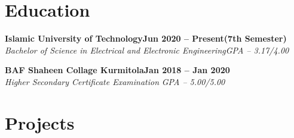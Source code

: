 \documentclass[letterpaper,10pt]{article}
\newcommand{\heading}[2]{
  \hspace{10pt}#1\hfill#2\\
}
\newcommand{\headingBf}[2]{
  \heading{\textbf{#1}}{\textbf{#2}}
}
\newcommand{\headingIt}[2]{
  \heading{\textit{#1}}{\textit{#2}}
}
\newenvironment{resume_list}{
  \vspace{-7pt}
  \begin{itemize}[itemsep=-2px, parsep=1pt, leftmargin=30pt]
}{
  \end{itemize}
}
\begin{document}


  \section{Education}

  \headingBf{Islamic University of Technology}{\textbf{Jun 2020 -- Present(7th Semester)}} %
  \headingIt{Bachelor of Science in Electrical and Electronic Engineering}{GPA -- 3.17/4.00}

  \vspace{3pt}

  \headingBf{BAF Shaheen Collage Kurmitola}{\textbf{Jan 2018 -- Jan 2020}} %
  \headingIt{Higher Secondary Certificate Examination }{GPA -- 5.00/5.00}


  \section{Projects}
\end{document}

